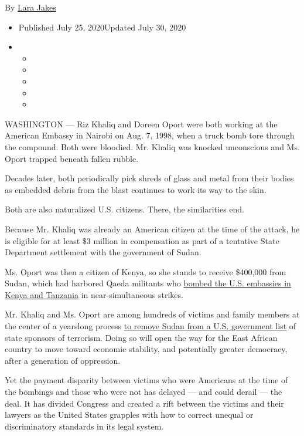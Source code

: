 By \href{https://www.nytimes3xbfgragh.onion/by/lara-jakes}{Lara Jakes}

\begin{itemize}
\item
  Published July 25, 2020Updated July 30, 2020
\item
  \begin{itemize}
  \item
  \item
  \item
  \item
  \item
  \end{itemize}
\end{itemize}

WASHINGTON --- Riz Khaliq and Doreen Oport were both working at the
American Embassy in Nairobi on Aug. 7, 1998, when a truck bomb tore
through the compound. Both were bloodied. Mr. Khaliq was knocked
unconscious and Ms. Oport trapped beneath fallen rubble.

Decades later, both periodically pick shreds of glass and metal from
their bodies as embedded debris from the blast continues to work its way
to the skin.

Both are also naturalized U.S. citizens. There, the similarities end.

Because Mr. Khaliq was already an American citizen at the time of the
attack, he is eligible for at least \$3 million in compensation as part
of a tentative State Department settlement with the government of Sudan.

Ms. Oport was then a citizen of Kenya, so she stands to receive
\$400,000 from Sudan, which had harbored Qaeda militants who
\href{https://www.fbi.gov/history/famous-cases/east-african-embassy-bombings}{bombed
the U.S. embassies in Kenya and Tanzania} in near-simultaneous strikes.

Mr. Khaliq and Ms. Oport are among hundreds of victims and family
members at the center of a yearslong process
\href{https://www.nytimes3xbfgragh.onion/2017/11/16/world/africa/sudan-terrorism-sanctions.html}{to
remove Sudan from a U.S. government list} of state sponsors of
terrorism. Doing so will open the way for the East African country to
move toward economic stability, and potentially greater democracy, after
a generation of oppression.

Yet the payment disparity between victims who were Americans at the time
of the bombings and those who were not has delayed --- and could derail
--- the deal. It has divided Congress and created a rift between the
victims and their lawyers as the United States grapples with how to
correct unequal or discriminatory standards in its legal system.

